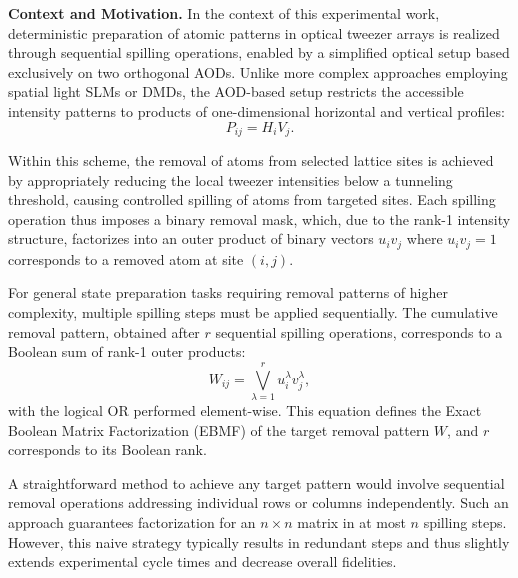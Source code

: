 
\textbf{Context and Motivation.} In the context of this experimental work, deterministic preparation of atomic patterns in optical tweezer arrays is realized through sequential spilling operations, enabled by a simplified optical setup based exclusively on two orthogonal AODs. Unlike more complex approaches employing spatial light SLMs or DMDs, the AOD-based setup restricts the accessible intensity patterns to products of one-dimensional horizontal and vertical profiles:
\begin{equation*}
P_{ij} = H_i V_j.
\end{equation*}

Within this scheme, the removal of atoms from selected lattice sites is achieved by appropriately reducing the local tweezer intensities below a tunneling threshold, causing controlled spilling of atoms from targeted sites. Each spilling operation thus imposes a binary removal mask, which, due to the rank-1 intensity structure, factorizes into an outer product of binary vectors $u_i v_j$ where $u_i v_j=1$ corresponds to a removed atom at site $(i,j)$.

For general state preparation tasks requiring removal patterns of higher complexity, multiple spilling steps must be applied sequentially. The cumulative removal pattern, obtained after $r$ sequential spilling operations, corresponds to a Boolean sum of rank-1 outer products:
\begin{equation*}
W_{ij} = \bigvee_{\lambda=1}^{r} u_i^\lambda v_j^\lambda,
\end{equation*}
with the logical OR performed element-wise. This equation defines the Exact Boolean Matrix Factorization (EBMF) of the target removal pattern $W$, and $r$ corresponds to its Boolean rank.

A straightforward method to achieve any target pattern would involve sequential removal operations addressing individual rows or columns independently. Such an approach guarantees factorization for an $n\times n$ matrix in at most $n$ spilling steps. However, this naive strategy typically results in redundant steps and thus slightly extends experimental cycle times and decrease overall fidelities.




